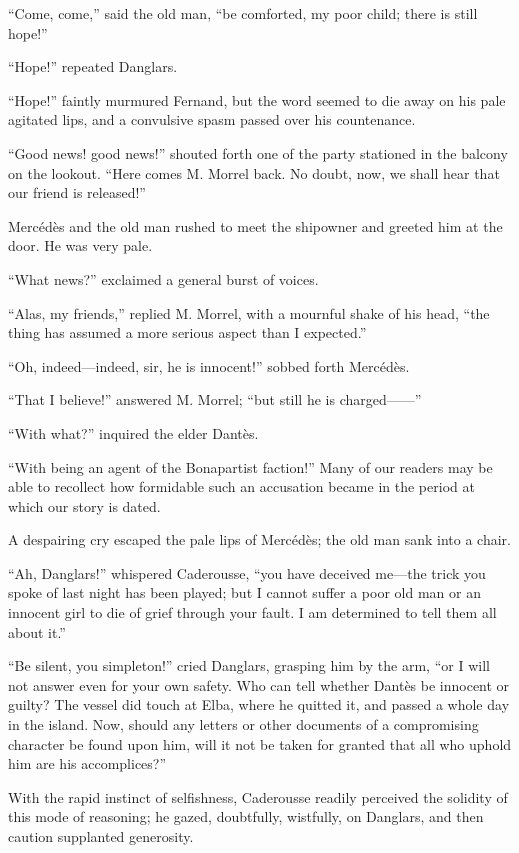 “Come, come,” said the old man, “be comforted, my poor child; there is
still hope!”

“Hope!” repeated Danglars.

“Hope!” faintly murmured Fernand, but the word seemed to die away on
his pale agitated lips, and a convulsive spasm passed over his
countenance.

“Good news! good news!” shouted forth one of the party stationed in the
balcony on the lookout. “Here comes M. Morrel back. No doubt, now, we
shall hear that our friend is released!”

Mercédès and the old man rushed to meet the shipowner and greeted him
at the door. He was very pale.

“What news?” exclaimed a general burst of voices.

“Alas, my friends,” replied M. Morrel, with a mournful shake of his
head, “the thing has assumed a more serious aspect than I expected.”

“Oh, indeed—indeed, sir, he is innocent!” sobbed forth Mercédès.

“That I believe!” answered M. Morrel; “but still he is charged——”

“With what?” inquired the elder Dantès.

“With being an agent of the Bonapartist faction!” Many of our readers
may be able to recollect how formidable such an accusation became in
the period at which our story is dated.

A despairing cry escaped the pale lips of Mercédès; the old man sank
into a chair.

“Ah, Danglars!” whispered Caderousse, “you have deceived me—the trick
you spoke of last night has been played; but I cannot suffer a poor old
man or an innocent girl to die of grief through your fault. I am
determined to tell them all about it.”

“Be silent, you simpleton!” cried Danglars, grasping him by the arm,
“or I will not answer even for your own safety. Who can tell whether
Dantès be innocent or guilty? The vessel did touch at Elba, where he
quitted it, and passed a whole day in the island. Now, should any
letters or other documents of a compromising character be found upon
him, will it not be taken for granted that all who uphold him are his
accomplices?”

With the rapid instinct of selfishness, Caderousse readily perceived
the solidity of this mode of reasoning; he gazed, doubtfully,
wistfully, on Danglars, and then caution supplanted generosity.

